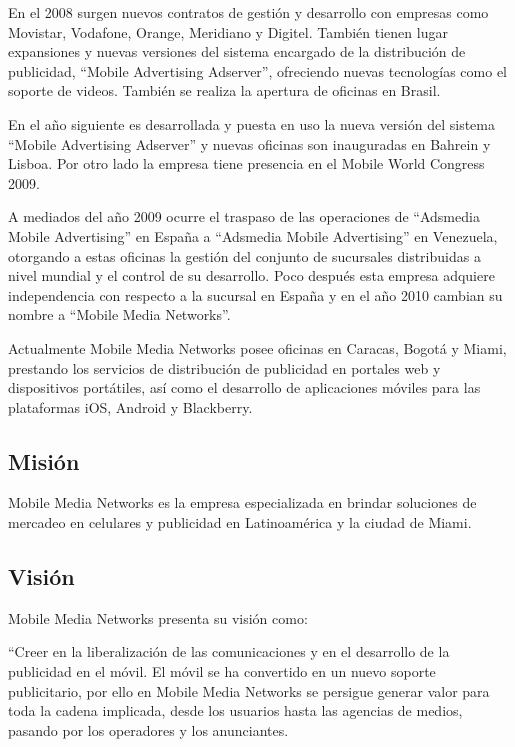 En el 2008 surgen nuevos contratos de gestión y desarrollo con empresas
como Movistar, Vodafone, Orange, Meridiano y Digitel. También tienen
lugar expansiones y nuevas versiones del sistema encargado de la distribución
de publicidad, \textquotedblleft{}Mobile Advertising Adserver\textquotedblright{},
ofreciendo nuevas tecnologías como el soporte de videos. También se
realiza la apertura de oficinas en Brasil. 

En el año siguiente es desarrollada y puesta en uso la nueva versión
del sistema \textquotedblleft{}Mobile Advertising Adserver\textquotedblright{}
y nuevas oficinas son inauguradas en Bahrein y Lisboa. Por otro lado
la empresa tiene presencia en el Mobile World Congress 2009. \cite{Cap1.Hitos}

A mediados del año 2009 ocurre el traspaso de las operaciones de \textquotedblleft{}Adsmedia
Mobile Advertising\textquotedblright{} en España a \textquotedblleft{}Adsmedia
Mobile Advertising\textquotedblright{} en Venezuela, otorgando a estas
oficinas la gestión del conjunto de sucursales distribuidas a nivel
mundial y el control de su desarrollo. Poco después esta empresa adquiere
independencia con respecto a la sucursal en España y en el año 2010
cambian su nombre a \textquotedblleft{}Mobile Media Networks\textquotedblright{}. 

Actualmente Mobile Media Networks posee oficinas en Caracas, Bogotá
y Miami, prestando los servicios de distribución de publicidad en
portales web y dispositivos portátiles, así como el desarrollo de
aplicaciones móviles para las plataformas iOS, Android y Blackberry.


\subsection{Misión}

Mobile Media Networks es la empresa especializada en brindar soluciones
de mercadeo en celulares y publicidad en Latinoamérica y la ciudad
de Miami.


\subsection{Visión}

Mobile Media Networks presenta su visión como: 

\textquotedblleft{}Creer en la liberalización de las comunicaciones
y en el desarrollo de la publicidad en el móvil. El móvil se ha convertido
en un nuevo soporte publicitario, por ello en Mobile Media Networks
se persigue generar valor para toda la cadena implicada, desde los
usuarios hasta las agencias de medios, pasando por los operadores
y los anunciantes. 

